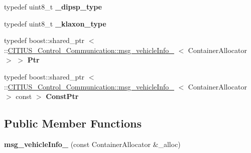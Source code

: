 \begin{DoxyCompactItemize}
\item 
\hypertarget{struct_c_i_t_i_u_s___control___communication_1_1msg__vehicle_info___aafd78cd5267f570201d3729cfbd558c0}{typedef uint8\-\_\-t {\bfseries \-\_\-dipsp\-\_\-type}}\label{struct_c_i_t_i_u_s___control___communication_1_1msg__vehicle_info___aafd78cd5267f570201d3729cfbd558c0}

\item 
\hypertarget{struct_c_i_t_i_u_s___control___communication_1_1msg__vehicle_info___a79eaeb47bf391bf7de7d58456076fcc2}{typedef uint8\-\_\-t {\bfseries \-\_\-klaxon\-\_\-type}}\label{struct_c_i_t_i_u_s___control___communication_1_1msg__vehicle_info___a79eaeb47bf391bf7de7d58456076fcc2}

\item 
\hypertarget{struct_c_i_t_i_u_s___control___communication_1_1msg__vehicle_info___ae8cba3a7fafbcc1138988e34bc3bcdcb}{typedef boost\-::shared\-\_\-ptr\*
$<$ \-::\hyperlink{struct_c_i_t_i_u_s___control___communication_1_1msg__vehicle_info__}{\-C\-I\-T\-I\-U\-S\-\_\-\-Control\-\_\-\-Communication\-::msg\-\_\-vehicle\-Info\-\_\-}\*
$<$ \-Container\-Allocator $>$ $>$ {\bfseries \-Ptr}}\label{struct_c_i_t_i_u_s___control___communication_1_1msg__vehicle_info___ae8cba3a7fafbcc1138988e34bc3bcdcb}

\item 
\hypertarget{struct_c_i_t_i_u_s___control___communication_1_1msg__vehicle_info___a55d2bd22895bec1ffa5ad8a54e9e0739}{typedef boost\-::shared\-\_\-ptr\*
$<$ \-::\hyperlink{struct_c_i_t_i_u_s___control___communication_1_1msg__vehicle_info__}{\-C\-I\-T\-I\-U\-S\-\_\-\-Control\-\_\-\-Communication\-::msg\-\_\-vehicle\-Info\-\_\-}\*
$<$ \-Container\-Allocator $>$ const  $>$ {\bfseries \-Const\-Ptr}}\label{struct_c_i_t_i_u_s___control___communication_1_1msg__vehicle_info___a55d2bd22895bec1ffa5ad8a54e9e0739}

\end{DoxyCompactItemize}
\subsection*{\-Public \-Member \-Functions}
\begin{DoxyCompactItemize}
\item 
\hypertarget{struct_c_i_t_i_u_s___control___communication_1_1msg__vehicle_info___ad5b6a2f6e7a006b4cb330b983acde057}{{\bfseries msg\-\_\-vehicle\-Info\-\_\-} (const \-Container\-Allocator \&\-\_\-alloc)}\label{struct_c_i_t_i_u_s___control___communication_1_1msg__vehicle_info___ad5b6a2f6e7a006b4cb330b983acde057}

\end{DoxyCompactItemize}
